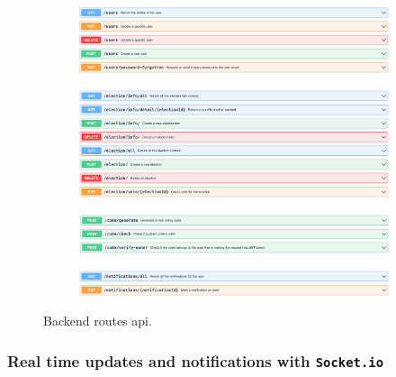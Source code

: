\documentclass{scrartcl}
\begin{document}
\begin{figure}
    \centering
    \begin{subfigure}[b]{0.3\textwidth}
        \centering
        \includegraphics[width=\textwidth]{./figures/backend-routes/users.png}
    \end{subfigure}
    \hfill
    \begin{subfigure}[b]{0.3\textwidth}
        \centering
        \includegraphics[width=\textwidth]{./figures/backend-routes/election.png}
    \end{subfigure}
    \hfill
    \begin{subfigure}[b]{0.3\textwidth}
        \centering
        \includegraphics[width=\textwidth]{./figures/backend-routes/code.png}
    \end{subfigure}
    \hfill
    \begin{subfigure}[b]{0.3\textwidth}
        \centering
        \includegraphics[width=\textwidth]{./figures/backend-routes/notifications.png}
    \end{subfigure}
    \hfill
    \caption{Backend routes api.}
    \label{fig:backend-routes}
\end{figure}

\subsubsection{Real time updates and notifications with \texttt{Socket.io}}
\end{document}
